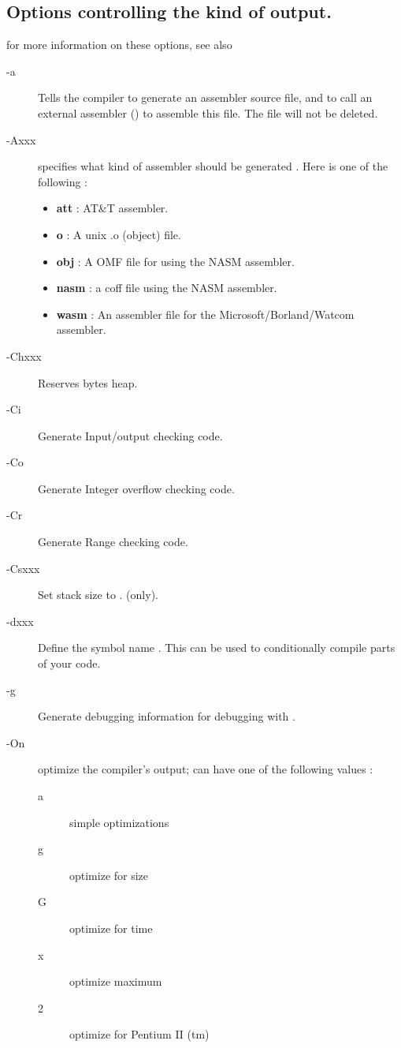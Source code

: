 \documentclass{report}
\newcommand{\olabel}[1]{\label{option:#1}}
\begin{document}
\subsection{Options controlling the kind of output.}
for more information on these options, see also \progref
\begin{description}
\item [-a] \olabel{a} Tells the compiler to generate an assembler source file, and to
call an external assembler () to assemble this file. The file will
not be deleted.
\item [-Axxx] \olabel{A}specifies what kind of assembler should be generated . Here
 is one of the following :
\begin{itemize}
\item \textbf{att} : AT\&T assembler.
\item \textbf{o} : A unix .o (object) file.
\item \textbf{obj} : A OMF file for using the NASM assembler.
\item \textbf{nasm} : a coff file using the NASM assembler.
\item \textbf{wasm} : An assembler file for the Microsoft/Borland/Watcom assembler.
\end{itemize}
\item [-Chxxx] \olabel {Ch} Reserves  bytes heap.
\item [-Ci] \olabel{Ci} Generate Input/output checking code.
\item [-Co] \olabel{Co} Generate Integer overflow checking code.
\item [-Cr] \olabel{Cr} Generate Range checking code.
\item [-Csxxx] \olabel{Cs} Set stack size to . (\ostwo only).
\item [-dxxx] \olabel{d} Define the symbol name . This can be used
to conditionally compile parts of your code.
\item [-g] \olabel{g} Generate debugging information for debugging with
.
\item[-On] \olabel{O} optimize the compiler's output;  can have one
of the following values :
\begin{description}
\item[a] simple optimizations
\item[g] optimize for size
\item[G] optimize for time
\item[x] optimize maximum
\item[2] optimize for Pentium II (tm)

\end{description}
\end{description}
\end{document}

